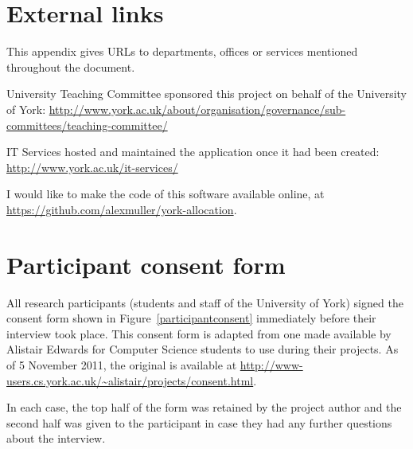 \documentclass[]{scrartcl}
\begin{document}
\appendix


\clearpage
\section{External links}

This appendix gives URLs to departments, offices or services mentioned
throughout the document.

University Teaching Committee sponsored this project on behalf of the
University of York:
\url{http://www.york.ac.uk/about/organisation/governance/sub-committees/teaching-committee/}

IT Services hosted and maintained the application once it had been created:
\url{http://www.york.ac.uk/it-services/}

I would like to make the code of this software available online, at
\url{https://github.com/alexmuller/york-allocation}.

\clearpage
\section{Participant consent form}
\label{sec:consent}

All research participants (students and staff of the University of York)
signed the consent form shown in Figure~\ref{participantconsent} immediately
before their interview took place. This consent form is adapted from one made
available by Alistair Edwards for Computer Science students to use during
their projects. As of 5 November 2011, the original is available at
\url{http://www-users.cs.york.ac.uk/~alistair/projects/consent.html}.

In each case, the top half of the form was retained by the project author and
the second half was given to the participant in case they had any further
questions about the interview.
\end{document}
